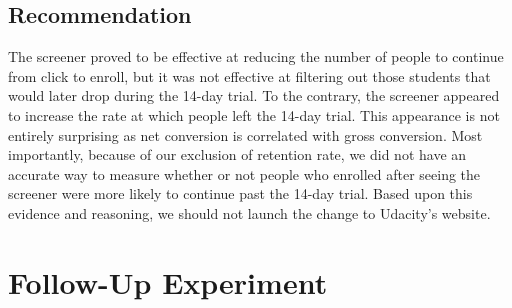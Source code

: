 \documentclass[paper=a4, fontsize=11pt]{scrartcl} %
\numberwithin{equation}{section} %
\numberwithin{figure}{section} %
\numberwithin{table}{section} %
\begin{document}

\subsection{Recommendation}

The screener proved to be effective at reducing the number of people to continue from click to enroll, but it was not effective at filtering out those students that would later drop during the 14-day trial. To the contrary, the screener appeared to increase the rate at which people left the 14-day trial.  This appearance is not entirely surprising as net conversion is correlated with gross conversion.  Most importantly, because of our exclusion of retention rate, we did not have an accurate way to measure whether or not people who enrolled after seeing the screener were more likely to continue past the 14-day trial.  Based upon this evidence and reasoning, we should not launch the change to Udacity's website. \newline


\section{Follow-Up Experiment}
\end{document}
